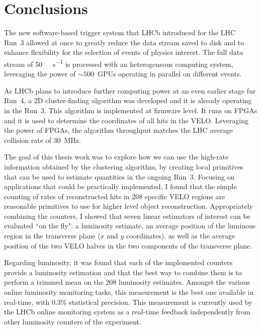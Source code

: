 
\chapter{Conclusions}
\label{chp:conclusion}
The new software-based trigger system that LHCb introduced for the LHC Run~3 allowed at once to greatly reduce the data stream saved to disk and to enhance flexibility for the selection of events of physics interest. The full data stream of \SI{50}{\tera\bit\per\second} is processed with an heterogeneous computing system, leveraging the power of $\sim 500$~GPUs operating in parallel on different events.

As LHCb plans to introduce further computing power at an even earlier stage fur Run~4, a 2D cluster-finding algorithm was developed and it is already operating in the Run~3. This algorithm is implemented at firmware level. It runs on FPGAs and it is used to determine the coordinates of all hits in the VELO. Leveraging the power of FPGAs, the algorithm throughput matches the LHC average collision rate of \SI{30}{\mega\hertz}.

The goal of this thesis work was to explore how we can use the high-rate information obtained by the clustering algorithm, by creating local primitives that can be used to estimate quantities in the ongoing Run~3.
Focusing on applications that could be practically implemented, I found that the simple counting of rates of reconstructed hits in 208 specific VELO regions are reasonable primitives to use for higher level object reconstruction. Appropriately combining the counters, I showed that seven linear estimators of interest can be evaluated ``on the fly": a luminosity estimate, an average position of the luminous region in the transverse plane ($x$ and $y$ coordinates), as well as the average position of the two VELO halves in the two components of the transverse plane.

Regarding luminosity, it was found that each of the implemented counters provide a luminosity estimation and that the best way to combine them is to perform a trimmed mean on the 208 luminosity estimates. Amongst the various online luminosity monitoring tasks, this measurement is the best one available in real-time, with 0.3\% statistical precision. This measurement is currently used by the LHCb online monitoring system as a real-time feedback independently from other luminosity counters of the experiment.

